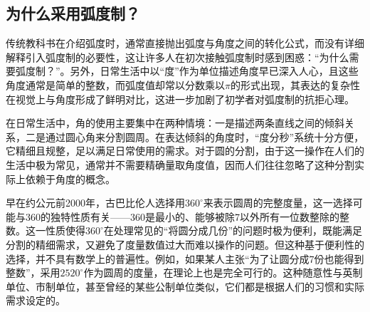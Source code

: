 
\begin{issues}
\issueMissDepend
\end{issues}

\subsection{为什么采用弧度制？}

传统教科书在介绍弧度时，通常直接抛出弧度与角度之间的转化公式，而没有详细解释引入弧度制的必要性，这让许多人在初次接触弧度制时感到困惑：“为什么需要弧度制？”。另外，日常生活中以“度”作为单位描述角度早已深入人心，且这些角度通常是简单的整数，而弧度值却常以分数乘以$\pi$的形式出现，其表达的复杂性在视觉上与角度形成了鲜明对比，这进一步加剧了初学者对弧度制的抗拒心理。

在日常生活中，角的使用主要集中在两种情境：一是描述两条直线之间的倾斜关系，二是通过圆心角来分割圆周。在表达倾斜的角度时，“度分秒”系统十分方便，它精细且规整，足以满足日常使用的需求。对于圆的分割，由于这一操作在人们的生活中极为常见，通常并不需要精确量取角度值，因而人们往往忽略了这种分割实际上依赖于角度的概念。

早在约公元前2000年，古巴比伦人选择用$360^\circ$来表示圆周的完整度量，这一选择可能与360的独特性质有关——360是最小的、能够被除7以外所有一位数整除的整数。这一性质使得$360^\circ$在处理常见的“将圆分成几份”的问题时极为便利，既能满足分割的精细需求，又避免了度量数值过大而难以操作的问题。但这种基于便利性的选择，并不具有数学上的普遍性。例如，如果某人主张“为了让圆分成7份也能得到整数”，采用$2520^\circ$作为圆周的度量，在理论上也是完全可行的。这种随意性与英制单位、市制单位，甚至曾经的某些公制单位类似，它们都是根据人们的习惯和实际需求设定的。

